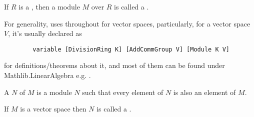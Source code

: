 \begin{definition}
    \label{VectorSpace}
    \leanok

    If $R$ is a , then a module $M$ over $R$ is called a .

\end{definition}

\begin{remark}
    \label{mk:VectorSpace}

    For generality, \Mathlib uses  throughout for vector spaces,
    particularly, for a vector space $V$, it's usually declared as

    \begin{lstlisting}
        variable [DivisionRing K] [AddCommGroup V] [Module K V]
    \end{lstlisting}

    for definitions/theorems about it, and most of them can be found under \textsf{Mathlib.LinearAlgebra} e.g. .
    
\end{remark}

\begin{remark}
    \label{mk:Submodule}

    A  $N$ of $M$ is a module $N$ such that every element of $N$ is also an element of $M$.

    If $M$ is a vector space then $N$ is called a .

\end{remark}





    

